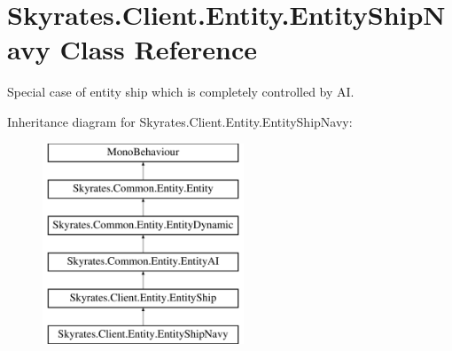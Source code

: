 \hypertarget{class_skyrates_1_1_client_1_1_entity_1_1_entity_ship_navy}{\section{Skyrates.\-Client.\-Entity.\-Entity\-Ship\-Navy Class Reference}
\label{class_skyrates_1_1_client_1_1_entity_1_1_entity_ship_navy}
}


Special case of entity ship which is completely controlled by A\-I.  


Inheritance diagram for Skyrates.\-Client.\-Entity.\-Entity\-Ship\-Navy\-:\begin{figure}[H]
\begin{center}
\leavevmode
\includegraphics[height=6.000000cm]{class_skyrates_1_1_client_1_1_entity_1_1_entity_ship_navy}
\end{center}
\end{figure}
